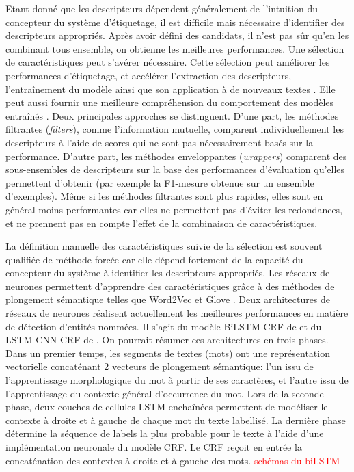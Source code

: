 Etant donné que les descripteurs dépendent généralement de l'intuition du concepteur du système d'étiquetage, il est difficile mais nécessaire d'identifier des descripteurs appropriés. Après avoir défini des candidats, il n'est pas sûr qu'en les combinant tous ensemble, on obtienne les meilleures performances. Une sélection de caractéristiques peut s'avérer nécessaire. Cette sélection peut améliorer les performances d'étiquetage, et accélérer l'extraction des descripteurs, l'entraînement du modèle ainsi que son application à de nouveaux textes \citep{kitoogo2007featureSelectNER}. Elle peut aussi fournir une meilleure compréhension du comportement des modèles entraînés \citep{klinger2009FeaturefilterCRF}. Deux principales approches se distinguent. D'une part, les méthodes \og filtrantes \fg{} (\textit{filters}), comme l'information mutuelle, comparent individuellement les descripteurs à l'aide de scores qui ne sont pas nécessairement basés sur la performance. D'autre part, les méthodes \og enveloppantes \fg{} (\textit{wrappers}) comparent des sous-ensembles de descripteurs sur la base des performances d'évaluation qu'elles permettent d'obtenir (par exemple la F1-mesure obtenue sur un ensemble d'exemples). Même si les méthodes filtrantes sont plus rapides, elles sont en général moins performantes car elles ne permettent pas d'éviter les redondances, et ne prennent pas en compte l'effet de la combinaison de caractéristiques.

La définition manuelle des caractéristiques suivie de la sélection est souvent qualifiée de méthode forcée car elle dépend fortement de la capacité du concepteur du système à identifier les descripteurs appropriés. Les réseaux de neurones permettent d'apprendre des caractéristiques  grâce à des méthodes de plongement sémantique telles que Word2Vec \citep{lemikolov2014word2vec} et Glove \citep{pennington2014glove}.  Deux architectures de réseaux de neurones réalisent actuellement les meilleures performances en matière de détection d'entités nommées. Il s'agit du modèle BiLSTM-CRF de  \citet{lample2016nnner} et du LSTM-CNN-CRF de \citet{ma2016lstm-cnns-crf}. On pourrait résumer ces architectures en trois phases. Dans un premier temps, les segments de textes (mots) ont une représentation vectorielle concaténant 2 vecteurs de plongement sémantique: l'un issu de l'apprentissage morphologique du mot à partir de ses caractères, et l'autre issu de l'apprentissage du contexte général d'occurrence du mot. Lors de la seconde phase, deux couches de cellules LSTM enchaînées permettent de modéliser le contexte à droite et à gauche de chaque mot du texte labellisé. La dernière phase détermine la séquence de labels la plus probable pour le texte à l'aide d'une implémentation neuronale du modèle CRF. Le CRF reçoit en entrée la concaténation des contextes à droite et à gauche des mots. \textcolor{red}{schémas du biLSTM}

